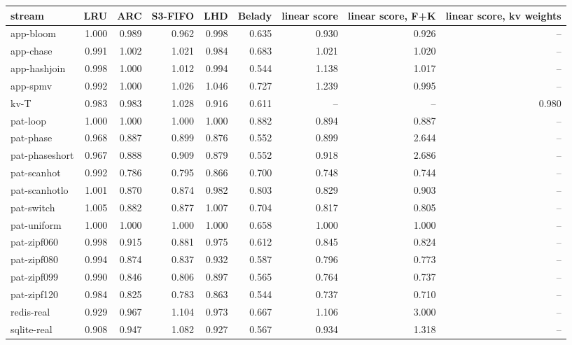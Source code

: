 \begin{tabular}{lrrrrrrrr}
\toprule
stream & LRU & ARC & S3-FIFO & LHD & Belady & linear score & linear score, F+K & linear score, kv weights \\
\midrule
app-bloom & 1.000 & 0.989 & 0.962 & 0.998 & 0.635 & 0.930 & 0.926 & -- \\
app-chase & 0.991 & 1.002 & 1.021 & 0.984 & 0.683 & 1.021 & 1.020 & -- \\
app-hashjoin & 0.998 & 1.000 & 1.012 & 0.994 & 0.544 & 1.138 & 1.017 & -- \\
app-spmv & 0.992 & 1.000 & 1.026 & 1.046 & 0.727 & 1.239 & 0.995 & -- \\
kv-T & 0.983 & 0.983 & 1.028 & 0.916 & 0.611 & -- & -- & 0.980 \\
pat-loop & 1.000 & 1.000 & 1.000 & 1.000 & 0.882 & 0.894 & 0.887 & -- \\
pat-phase & 0.968 & 0.887 & 0.899 & 0.876 & 0.552 & 0.899 & 2.644 & -- \\
pat-phaseshort & 0.967 & 0.888 & 0.909 & 0.879 & 0.552 & 0.918 & 2.686 & -- \\
pat-scanhot & 0.992 & 0.786 & 0.795 & 0.866 & 0.700 & 0.748 & 0.744 & -- \\
pat-scanhotlo & 1.001 & 0.870 & 0.874 & 0.982 & 0.803 & 0.829 & 0.903 & -- \\
pat-switch & 1.005 & 0.882 & 0.877 & 1.007 & 0.704 & 0.817 & 0.805 & -- \\
pat-uniform & 1.000 & 1.000 & 1.000 & 1.000 & 0.658 & 1.000 & 1.000 & -- \\
pat-zipf060 & 0.998 & 0.915 & 0.881 & 0.975 & 0.612 & 0.845 & 0.824 & -- \\
pat-zipf080 & 0.994 & 0.874 & 0.837 & 0.932 & 0.587 & 0.796 & 0.773 & -- \\
pat-zipf099 & 0.990 & 0.846 & 0.806 & 0.897 & 0.565 & 0.764 & 0.737 & -- \\
pat-zipf120 & 0.984 & 0.825 & 0.783 & 0.863 & 0.544 & 0.737 & 0.710 & -- \\
redis-real & 0.929 & 0.967 & 1.104 & 0.973 & 0.667 & 1.106 & 3.000 & -- \\
sqlite-real & 0.908 & 0.947 & 1.082 & 0.927 & 0.567 & 0.934 & 1.318 & -- \\
\bottomrule
\end{tabular}
